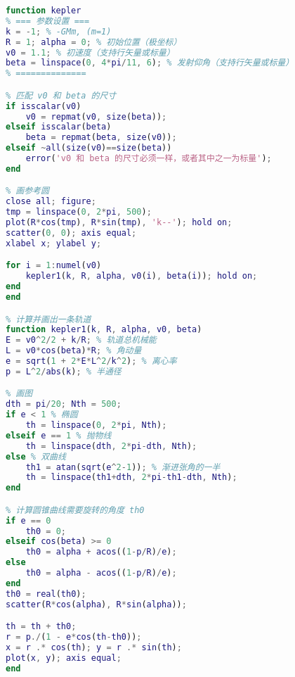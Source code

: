 \begin{lstlisting}[language=matlab]
% 已知初始位置、发射速度、发射方向， 求轨道以及运动方程
function kepler
% === 参数设置 ===
k = -1; % -GMm, (m=1)
R = 1; alpha = 0; % 初始位置（极坐标）
v0 = 1.1; % 初速度（支持行矢量或标量）
beta = linspace(0, 4*pi/11, 6); % 发射仰角（支持行矢量或标量）
% ==============

% 匹配 v0 和 beta 的尺寸
if isscalar(v0)
    v0 = repmat(v0, size(beta));
elseif isscalar(beta)
    beta = repmat(beta, size(v0));
elseif ~all(size(v0)==size(beta))
    error('v0 和 beta 的尺寸必须一样，或者其中之一为标量');
end

% 画参考圆
close all; figure;
tmp = linspace(0, 2*pi, 500);
plot(R*cos(tmp), R*sin(tmp), 'k--'); hold on;
scatter(0, 0); axis equal;
xlabel x; ylabel y;

for i = 1:numel(v0)
    kepler1(k, R, alpha, v0(i), beta(i)); hold on;
end
end

% 计算并画出一条轨道
function kepler1(k, R, alpha, v0, beta)
E = v0^2/2 + k/R; % 轨道总机械能
L = v0*cos(beta)*R; % 角动量
e = sqrt(1 + 2*E*L^2/k^2); % 离心率
p = L^2/abs(k); % 半通径

% 画图
dth = pi/20; Nth = 500;
if e < 1 % 椭圆
    th = linspace(0, 2*pi, Nth);
elseif e == 1 % 抛物线
    th = linspace(dth, 2*pi-dth, Nth);
else % 双曲线
    th1 = atan(sqrt(e^2-1)); % 渐进张角的一半
    th = linspace(th1+dth, 2*pi-th1-dth, Nth);
end

% 计算圆锥曲线需要旋转的角度 th0
if e == 0
    th0 = 0;
elseif cos(beta) >= 0
    th0 = alpha + acos((1-p/R)/e);
else
    th0 = alpha - acos((1-p/R)/e);
end
th0 = real(th0);
scatter(R*cos(alpha), R*sin(alpha));

th = th + th0;
r = p./(1 - e*cos(th-th0));
x = r .* cos(th); y = r .* sin(th);
plot(x, y); axis equal;
end
\end{lstlisting}
